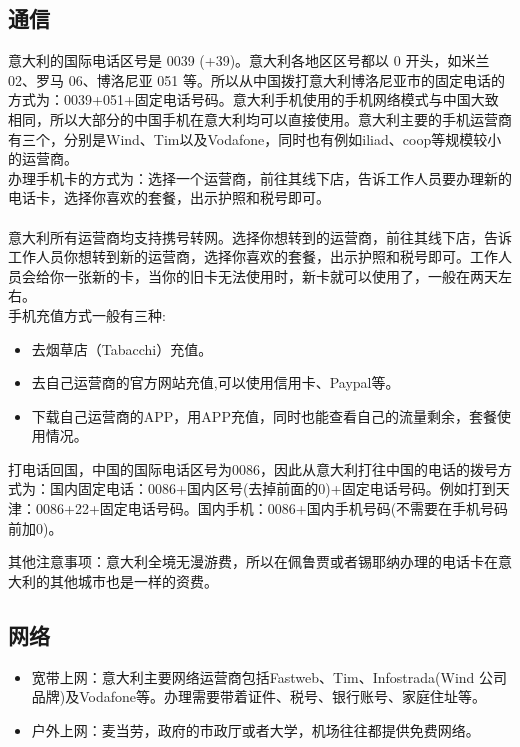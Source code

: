 \subsection{通信}
意大利的国际电话区号是 0039 (+39)。意大利各地区区号都以 0 开头，如米兰 02、罗马 06、博洛尼亚 051 等。所以从中国拨打意大利博洛尼亚市的固定电话的方式为：0039+051+固定电话号码。意大利手机使用的手机网络模式与中国大致相同，所以大部分的中国手机在意大利均可以直接使用。意大利主要的手机运营商有三个，分别是Wind、Tim以及Vodafone，同时也有例如iliad、coop等规模较小的运营商。 \\
办理手机卡的方式为：选择一个运营商，前往其线下店，告诉工作人员要办理新的电话卡，选择你喜欢的套餐，出示护照和税号即可。\\
\\
意大利所有运营商均支持携号转网。选择你想转到的运营商，前往其线下店，告诉工作人员你想转到新的运营商，选择你喜欢的套餐，出示护照和税号即可。工作人员会给你一张新的卡，当你的旧卡无法使用时，新卡就可以使用了，一般在两天左右。\\



手机充值方式一般有三种:
\begin{itemize}
\item 去烟草店（Tabacchi）充值。 
\item 去自己运营商的官方网站充值,可以使用信用卡、Paypal等。 
\item 下载自己运营商的APP，用APP充值，同时也能查看自己的流量剩余，套餐使用情况。
\end{itemize}
打电话回国，中国的国际电话区号为0086，因此从意大利打往中国的电话的拨号方式为：国内固定电话：0086+国内区号(去掉前面的0)+固定电话号码。例如打到天津：0086+22+固定电话号码。国内手机：0086+国内手机号码(不需要在手机号码前加0)。

其他注意事项：意大利全境无漫游费，所以在佩鲁贾或者锡耶纳办理的电话卡在意大利的其他城市也是一样的资费。 
\subsection{网络}

\begin{itemize}
\item 宽带上网：意大利主要网络运营商包括Fastweb、Tim、Infostrada(Wind 公司品牌)及Vodafone等。办理需要带着证件、税号、银行账号、家庭住址等。
\item 户外上网：麦当劳，政府的市政厅或者大学，机场往往都提供免费网络。
\end{itemize}
